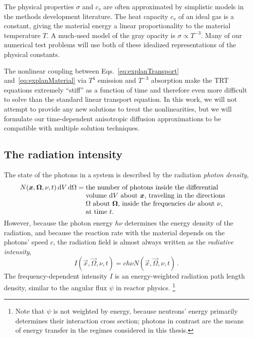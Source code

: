 The physical properties $\sigma$ and $c_v$ are often approximated by simplistic
models in the methods development literature. The heat capacity $c_v$ of an ideal
gas is a constant, giving the material energy a linear proportionality to
the material temperature $T$. A much-used model \cite{Mou2006,Wol2008} of the
gray opacity is $\sigma \propto T^{-3}$.
Many of our numerical test problems will use both of these idealized
representations of the physical constants.

The nonlinear coupling between Eqs.~\eqref{eq:explanTransport}
and~\eqref{eq:explanMaterial} via $T^4$ emission and $T^{-3}$ absorption make
the TRT equations extremely ``stiff'' as a function of time \cite{Kno2003} and
therefore even more
difficult to solve than the standard linear transport equation. In this work,
we will not attempt to provide any new solutions to treat the nonlinearities,
but we will formulate our time-dependent anisotropic diffusion approximations to
be compatible with multiple solution techniques.

\subsection{The radiation intensity}

The state of the photons in a system is described by the radiation
\emph{photon density},
\begin{align*}
  N(\vec{x},\vec{\Omega}, \nu, t) \ud V \ud \Omega
  &= \topbox{the number of photons inside the differential volume $\ud V$
  about $\vec{x}$, traveling in the directions $\Omega$ about
  $\vec{\Omega}$, inside the frequencies $\ud \nu$ about $\nu$, at time $t$.}
\end{align*}
However, because the photon energy $h\nu$ determines the energy
density of the radiation, and because the reaction rate with the material
depends on the photons' speed $c$, the radiation field is almost always written
as the \emph{radiative intensity},
\begin{equation*}
  I(\vec{x},\vec{\Omega},\nu, t) = c h\nu N(\vec{x},\vec{\Omega},\nu, t)\,.
\end{equation*}
The frequency-dependent intensity $I$ is an energy-weighted radiation path
length density, similar to the angular flux $\psi$ in reactor physics.%
\footnote{Note that $\psi$ is not weighted by energy, because neutrons' energy
primarily determines their interaction cross section; photons in contrast are
the means of energy transfer in the regimes considered in this thesis.}

